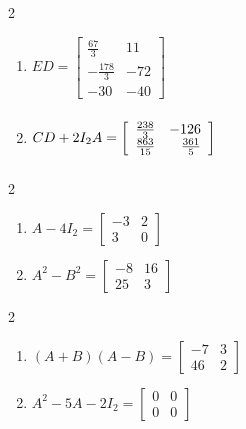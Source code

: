 \documentclass{ximera}
\begin{document}
\begin{multicols}{2} 
\begin{enumerate}
\setcounter{enumi}{\value{HW}}

\item $ED = \left[ \begin{array}{rr} \frac{67}{3}& 11 \\  -\frac{178}{3} & -72 \\ -30 & -40 \end{array} \right]$
\item $CD + 2I_{2}A = \left[ \begin{array}{rr} \frac{238}{3} & -126 \\  \frac{863}{15} & \frac{361}{5} \end{array} \right] \vphantom{\left[ \begin{array}{rr} \frac{67}{3}& 11 \\  -\frac{178}{3} & -72 \\ -30 & -40 \end{array} \right]}$


\setcounter{HW}{\value{enumi}}
\end{enumerate}
\end{multicols}

\begin{multicols}{2} 
\begin{enumerate}
\setcounter{enumi}{\value{HW}}

\item  $A - 4I_{2} = \left[ \begin{array}{rr} -3 & 2 \\ 3 & 0 \end{array} \right]$

\item  $A^2 - B^2 = \left[ \begin{array}{rr} -8 & 16 \\ 25 & 3 \end{array} \right]$


\setcounter{HW}{\value{enumi}}
\end{enumerate}
\end{multicols}

\begin{multicols}{2} 
\begin{enumerate}
\setcounter{enumi}{\value{HW}}

\item  $(A+B)(A-B) = \left[ \begin{array}{rr} -7 & 3 \\ 46 & 2 \end{array} \right]$

\item  $A^2-5A-2I_{2} = \left[ \begin{array}{rr} 0 & 0 \\ 0 & 0 \end{array} \right]$


\setcounter{HW}{\value{enumi}}
\end{enumerate}
\end{multicols}
\end{document}
